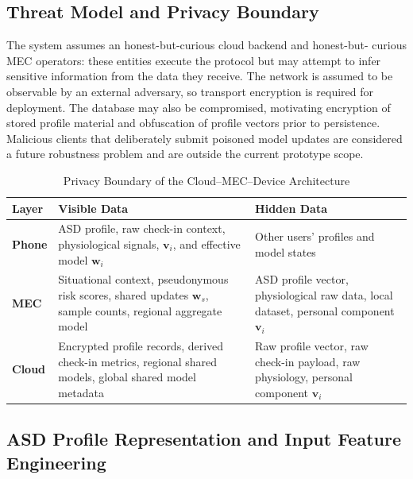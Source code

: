 \documentclass[lettersize,journal]{IEEEtran}
\begin{document}
\subsection{Threat Model and Privacy Boundary}

The system assumes an honest-but-curious cloud backend and honest-but-
curious MEC operators: these entities execute the protocol but may
attempt to infer sensitive information from the data they receive. The
network is assumed to be observable by an external adversary, so
transport encryption is required for deployment. The database may also
be compromised, motivating encryption of stored profile material and
obfuscation of profile vectors prior to persistence. Malicious clients
that deliberately submit poisoned model updates are considered a future
robustness problem and are outside the current prototype scope.

\begin{table}[!t]
    \centering
    \caption{Privacy Boundary of the Cloud--MEC--Device Architecture\label{tab:privacy_boundary}}
    \scriptsize
    \renewcommand{\arraystretch}{1.25}
    \begin{tabularx}{\columnwidth}{
        >{\raggedright\bfseries}p{1.5cm}
        >{\raggedright}X
        >{\raggedright\arraybackslash}X}
        \toprule
        \rowcolor{gray!15}
        \textbf{Layer} & \textbf{Visible Data} & \textbf{Hidden Data} \\
        \midrule
        Phone &
        ASD profile, raw check-in context, physiological signals,
        $\mathbf{v}_i$, and effective model $\mathbf{w}_i$ &
        Other users' profiles and model states \\
        \midrule
        MEC &
        Situational context, pseudonymous risk scores, shared
        updates $\mathbf{w}_s$, sample counts, regional aggregate model &
        ASD profile vector, physiological raw data, local dataset,
        personal component $\mathbf{v}_i$ \\
        \midrule
        Cloud &
        Encrypted profile records, derived check-in metrics, regional
        shared models, global shared model metadata &
        Raw profile vector, raw check-in payload, raw physiology,
        personal component $\mathbf{v}_i$ \\
        \bottomrule
    \end{tabularx}
\end{table}

\subsection{ASD Profile Representation and Input Feature Engineering}
\end{document}

